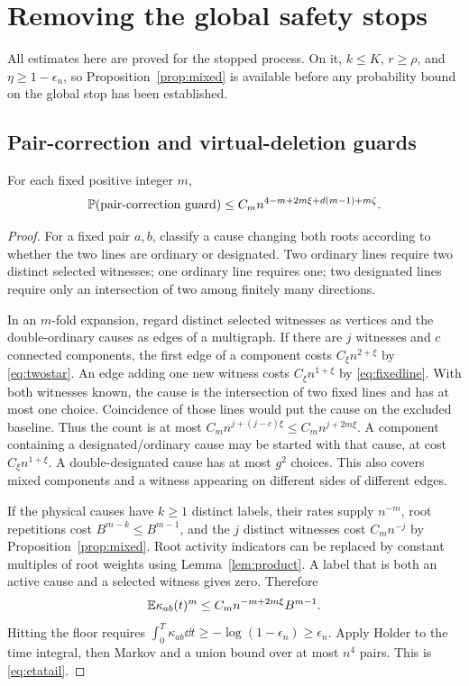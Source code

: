 \section{Removing the global safety stops}\label{sec:global}

All estimates here are proved for the stopped process. On it,
\(k\le K\), \(r\ge\rho\), and \(\eta\ge1-\epsilon_n\), so
Proposition~\ref{prop:mixed} is available before any probability bound
on the global stop has been established.

\subsection{Pair-correction and virtual-deletion guards}
\begin{lemma}\label{lem:etatail}
For each fixed positive integer \(m\),
\begin{equation}\label{eq:etatail}
 \mathbb P(\text{pair-correction guard})
 \le C_m n^{4-m+2m\xi+d(m-1)+m\zeta}.
\end{equation}
\end{lemma}
\begin{proof}
For a fixed pair \(a,b\), classify a cause changing both roots
according to whether the two lines are ordinary or designated.
Two ordinary lines require two distinct selected witnesses; one
ordinary line requires one; two designated lines require only an
intersection of two among finitely many directions.

In an \(m\)-fold expansion, regard distinct selected witnesses as
vertices and the double-ordinary causes as edges of a multigraph.
If there are \(j\) witnesses and \(c\) connected components, the
first edge of a component costs \(C_\xi n^{2+\xi}\) by
\eqref{eq:twostar}. An edge adding one new witness costs
\(C_\xi n^{1+\xi}\) by \eqref{eq:fixedline}. With both witnesses
known, the cause is the intersection of two fixed lines and has at
most one choice. Coincidence of those lines would put the cause on
the excluded baseline. Thus the count is at most
\(C_m n^{j+(j-c)\xi}\le C_m n^{j+2m\xi}\).
A component containing a designated/ordinary cause may be started
with that cause, at cost \(C_\xi n^{1+\xi}\). A double-designated
cause has at most \(g^2\) choices. This also covers mixed components
and a witness appearing on different sides of different edges.

If the physical causes have \(k\ge1\) distinct labels, their rates
supply \(n^{-m}\), root repetitions cost
\(B^{m-k}\le B^{m-1}\), and the \(j\) distinct witnesses cost
\(C_m n^{-j}\) by Proposition~\ref{prop:mixed}. Root activity
indicators can be replaced by constant multiples of root weights
using Lemma~\ref{lem:product}. A label that is both an active cause
and a selected witness gives zero. Therefore
\[
 \mathbb E\kappa_{ab}(t)^m\le C_m n^{-m+2m\xi}B^{m-1}.
\]
Hitting the floor requires
\(\int_0^T\kappa_{ab}\dd t\ge-\log(1-\epsilon_n)\ge\epsilon_n\).
Apply Holder to the time integral, then Markov and a union bound
over at most \(n^4\) pairs. This is \eqref{eq:etatail}.
\end{proof}

